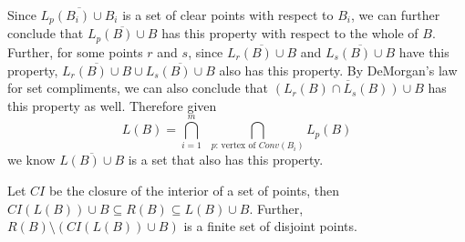 \documentclass{cccg12}
\begin{document}
Since $\overline{L_p(B_i)\cup B_i}$ is a set of clear points with respect to $B_i$, we can further conclude that $\overline{L_p(B) \cup B}$ has this property with respect to the whole of $B$. Further, for some points $r$ and $s$, since $\overline{L_r(B) \cup B}$ and $\overline{L_s(B) \cup B}$ have this property, $\overline{L_r(B) \cup B} \cup \overline{L_s(B) \cup B}$ also has this property. By DeMorgan's law for set compliments, we can also conclude that $\overline{(L_r(B) \cap L_s(B)) \cup B}$ has this property as well. Therefore given \[L(B) = \displaystyle\bigcap\limits_{i=1}^{m} \ \ \displaystyle\bigcap\limits_{p\text{: vertex of }Conv(B_i)}L_p(B)\] we know $\overline{L(B)\cup B}$ is a set that also has this property. 

\begin{theorem}
\label{thm:coverageComputation}
Let $CI$ be the closure of the interior of a set of points, then $CI(L(B)) \cup B \subseteq R(B) \subseteq L(B) \cup B$. Further, $R(B)\setminus (CI(L(B)) \cup B)$ is a finite set of disjoint points.
\end{theorem}
\end{document}
